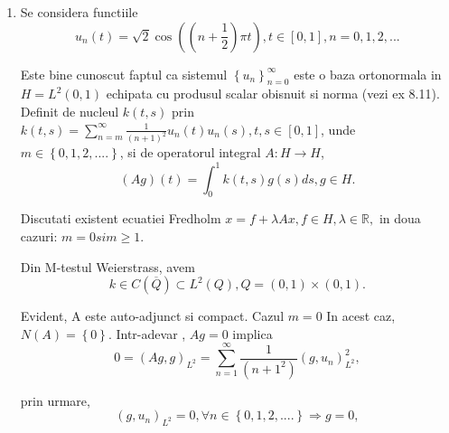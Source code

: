 \documentclass[a4paper,12pt,oneside]{report}
\begin{document}
\begin{enumerate}
		      	\item Se considera functiile 
		      	\begin{displaymath}
		      		u_{n}\left ( t \right ) = \sqrt{2} \cos \left ( \left ( n+ \frac{1}{2} \right )\pi t \right ), t \in\left [ 0,1 \right ], n = 0,1,2,...
		      	\end{displaymath}
		      			      			      	
		      	Este bine cunoscut faptul ca sistemul \(\left \{ u_{n} \right \}_{n=0}^{\infty }\) este o baza ortonormala in \(H  = L^{2} \left ( 0,1 \right )\) echipata cu produsul scalar obisnuit si norma (vezi ex 8.11). Definit de nucleul \(k\left ( t,s \right )\) prin 
		      	\(k\left ( t,s \right ) = \sum_{n=m}^{\infty } \frac{1}{\left ( n+1 \right )^{2}}u_{n}\left ( t \right )u_{n}\left ( s \right ), t,s \in \left [ 0,1 \right ]\), 
		      	unde \(m \in \left \{ 0,1,2,.... \right \}\), si de operatorul integral \(A : H \rightarrow H\), 
		      	\begin{displaymath}
		      		\left ( Ag \right )\left ( t \right ) = \int_{0}^{1} k\left ( t,s \right )g\left ( s \right )ds, g \in H. 
		      	\end{displaymath}
		      			      			      	
		      	Discutati existent ecuatiei Fredholm
		      	\(x = f + \lambda Ax, f \in H, \lambda \in \mathbb{R},\)
		      	in doua cazuri: \(m = 0 si m \geq 1\). 
		      			      			      	
		      	Din M-testul Weierstrass, avem 
		      	\begin{displaymath}
		      		k \in C\left ( \overline{Q} \right ) \subset L^{2}\left ( Q \right ), Q = \left ( 0,1 \right )\times \left ( 0,1 \right ).
		      	\end{displaymath}
		      			      			      	
		      	Evident, A este auto-adjunct si compact. 
		      	Cazul \(m = 0\)
		      	In acest caz, \(N\left ( A \right ) = \left \{ 0 \right \}\). Intr-adevar , \(Ag = 0\) implica 
		      	\begin{displaymath}
		      		0 = \left ( Ag,g \right )_{L^{2}} = \sum_{n= 1}^{\infty }\frac{1}{\left ( n+1^{2} \right )}\left ( g , u_{n} \right )_{L^{2}}^{2},
		      	\end{displaymath}
		      			      			      	 
		      	prin urmare, 
		      	\begin{displaymath}
		      		\left ( g,u_{n} \right )_{L^{2}} = 0, \forall n \in \left \{ 0,1,2,.... \right \}\Rightarrow g = 0, 
		      	\end{displaymath}
		      			      			      	

\end{enumerate}
\end{document}
